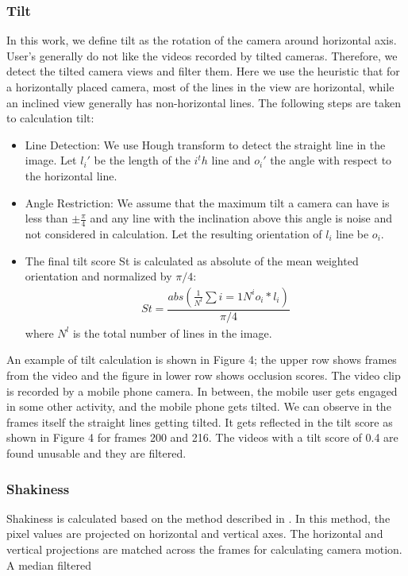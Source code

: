 \documentclass{sig-alternate}
\begin{document}
\subsubsection{Tilt}
In this work, we define tilt as the rotation of the camera around
horizontal axis. User’s generally do not like the videos recorded
by tilted cameras. Therefore, we detect the tilted camera views
and filter them. Here we use the heuristic that for a horizontally
placed camera, most of the lines in the view are horizontal, while
an inclined view generally has non-horizontal lines. The following
steps are taken to calculation tilt:
\begin{itemize}
\item Line Detection: We use Hough transform to detect the straight
line in the image. Let $l_i'$ be the length of the $i^th$ line and $o_i'$ the angle with respect to the horizontal line.

\item Angle Restriction: We assume that the maximum tilt a camera can have is less than $\pm \frac{\pi}{4}$ and any line with the inclination above this angle is noise and not considered in calculation. Let the resulting orientation of $l_i$ line be $o_i$.
\item The final tilt score St is calculated as absolute of the mean weighted orientation and normalized by $\pi/4$:
\begin{align}
St =\dfrac{abs(\frac{1}{N^l}\sum{i=1}{N^i}o_i*l_i)}{\pi/4}
\end{align}
where $N^l$ is the total number of lines in the image.
\end{itemize}
An example of tilt calculation is shown in Figure 4; the upper
row shows frames from the video and the figure in lower row shows
occlusion scores. The video clip is recorded by a mobile phone
camera. In between, the mobile user gets engaged in some other
activity, and the mobile phone gets tilted. We can observe in the
frames itself the straight lines getting tilted. It gets reflected in the
tilt score as shown in Figure 4 for frames 200 and 216. The videos
with a tilt score of 0.4 are found unusable and they are filtered.
\subsubsection{Shakiness}
Shakiness is calculated based on the method described in \cite{4}.
In this method, the pixel values are projected on horizontal and
vertical axes. The horizontal and vertical projections are matched
across the frames for calculating camera motion. A median filtered
\end{document}
